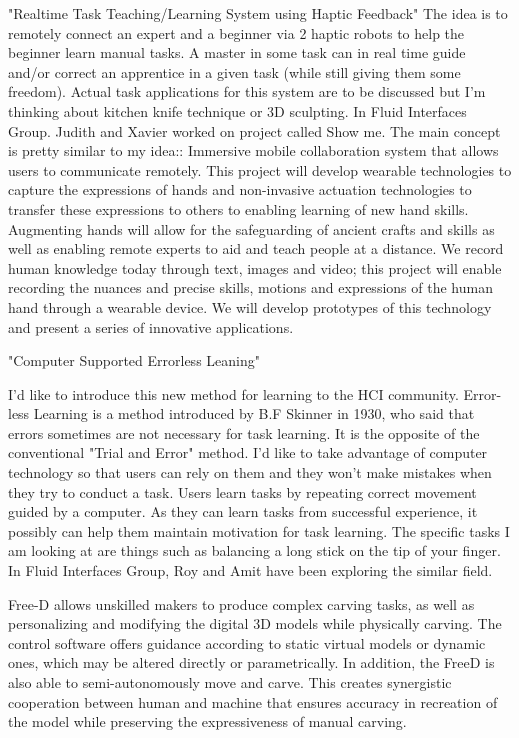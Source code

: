 \documentclass{article}
\begin{document}
"Realtime Task Teaching/Learning System using Haptic Feedback"
The idea is to remotely connect an expert and a beginner via 2 haptic robots to help the beginner learn manual tasks. A master in some task can in real time guide and/or correct an apprentice in a given task (while still giving them some freedom). Actual task applications for this system are to be discussed but I'm thinking about kitchen knife technique or 3D sculpting. In Fluid Interfaces Group. Judith and Xavier worked on project called Show me. The main concept is pretty similar to my idea:: Immersive mobile collaboration system that allows users to communicate remotely. This project will develop wearable technologies to capture the expressions of hands and non-invasive actuation technologies to transfer these expressions to others to enabling learning of new hand skills. Augmenting hands will allow for the safeguarding of ancient crafts and skills as well as enabling remote experts to aid and teach people at a distance. We record human knowledge today through text, images and video; this project will enable recording the nuances and precise skills, motions and expressions of the human hand through a wearable device. We will develop prototypes of this technology and present a series of innovative applications.


"Computer Supported Errorless Leaning" 


I'd like to introduce this new method for learning to the HCI community. Error-less Learning is a method introduced by B.F Skinner in 1930, who said that errors sometimes are not necessary for task learning. It is the opposite of the conventional "Trial and Error" method. I'd like to take advantage of computer technology so that users can rely on them and they won't make mistakes when they try to conduct a task. Users learn tasks by repeating correct movement guided by a computer. As they can learn tasks from successful experience, it possibly can help them  maintain motivation for task learning. The specific tasks I am looking at are things such as balancing a long stick on the tip of your finger. In Fluid Interfaces Group, Roy and Amit have been exploring the similar field. 

Free-D allows unskilled makers to produce complex carving tasks, as well as personalizing and modifying the digital 3D models while physically carving. The control software offers guidance according to static virtual models or dynamic ones, which may be altered directly or parametrically. In addition, the FreeD is also able to semi-autonomously move and carve. This creates synergistic cooperation between human and machine that ensures accuracy in recreation of the model while preserving the expressiveness of manual carving. 
\end{document}
